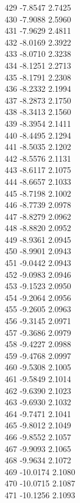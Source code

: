 \documentclass[11pt]{article}
\theoremstyle{definition}
\theoremstyle{plain}
\begin{document}
{429 -7.8547 2.7425\\
430 -7.9088 2.5960\\
431 -7.9629 2.4811\\
432 -8.0169 2.3922\\
433 -8.0710 2.3238\\
434 -8.1251 2.2713\\
435 -8.1791 2.2308\\
436 -8.2332 2.1994\\
437 -8.2873 2.1750\\
438 -8.3413 2.1560\\
439 -8.3954 2.1411\\
440 -8.4495 2.1294\\
441 -8.5035 2.1202\\
442 -8.5576 2.1131\\
443 -8.6117 2.1075\\
444 -8.6657 2.1033\\
445 -8.7198 2.1002\\
446 -8.7739 2.0978\\
447 -8.8279 2.0962\\
448 -8.8820 2.0952\\
449 -8.9361 2.0945\\
450 -8.9901 2.0943\\
451 -9.0442 2.0943\\
452 -9.0983 2.0946\\
453 -9.1523 2.0950\\
454 -9.2064 2.0956\\
455 -9.2605 2.0963\\
456 -9.3145 2.0971\\
457 -9.3686 2.0979\\
458 -9.4227 2.0988\\
459 -9.4768 2.0997\\
460 -9.5308 2.1005\\
461 -9.5849 2.1014\\
462 -9.6390 2.1023\\
463 -9.6930 2.1032\\
464 -9.7471 2.1041\\
465 -9.8012 2.1049\\
466 -9.8552 2.1057\\
467 -9.9093 2.1065\\
468 -9.9634 2.1072\\
469 -10.0174 2.1080\\
470 -10.0715 2.1087\\
471 -10.1256 2.1093\\
}
\end{document}
